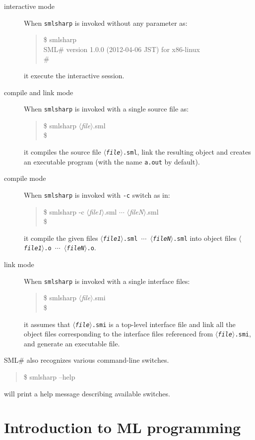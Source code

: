 \documentclass{jbook}
\newcommand{\txt}[2]{#2}
\newcommand{\smlsharp}{SML\#}
\newcommand{\nonterm}[1]{\mbox{$\langle$}{\it #1}\mbox{$\rangle$}}
\newenvironment{program}{\begin{tt}\begin{quote}}{\end{quote}\end{tt}}
\begin{document}
\begin{description}
\item[interactive mode]
When {\tt smlsharp} is invoked without any parameter as:
\begin{program}
\$ smlsharp\\
SML\# version 1.0.0 (2012-04-06 JST) for x86-linux\\
\# 
\end{program}
it execute the interactive session.
\item[compile and link mode]
When {\tt smlsharp} is invoked with a single source file as:
\begin{program}
\$ smlsharp \nonterm{file}.sml\\
\$ 
\end{program}
it compiles the source file {\tt \nonterm{file}.sml}, link the resulting
object and creates an executable program (with the name {\tt a.out} by default).
\item[compile mode]
When {\tt smlsharp} is invoked with {\tt -c} switch as in:
\begin{program}
\$ smlsharp -c \nonterm{file1}.sml $\cdots$ \nonterm{fileN}.sml \\
\$ 
\end{program}
it compile the given files {\tt \nonterm{file1}.sml $\cdots$
\nonterm{fileN}.sml}
into object files {\tt \nonterm{file1}.o $\cdots$
\nonterm{fileN}.o}.
\item[link mode]
When {\tt smlsharp} is invoked with a single interface files:
\begin{program}
\$ smlsharp \nonterm{file}.smi \\
\$ 
\end{program}
it assumes that {\tt \nonterm{file}.smi} is a top-level interface file
and link all the object files corresponding to the interface files
referenced from {\tt \nonterm{file}.smi}, and generate an executable
file.
\end{description}
	\smlsharp{} also recognizes various command-line switches.
\begin{program}
\$ smlsharp --help
\end{program}
will print a help message describing available switches.
\fi%

\chapter{\txt{MLプログラミング入門}{Introduction to ML programming}}
\label{chap:tutorialMlprogramming}
\end{document}
